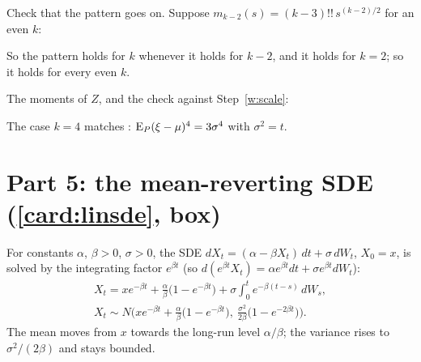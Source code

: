 \begin{steps}[resume]
\item\label{w:dfact} Check that the pattern goes on. Suppose $m_{k-2}(s)=(k-3)!!\,s^{(k-2)/2}$ for an even $k$:
\begin{deriv}
\end{deriv}
So the pattern holds for $k$ whenever it holds for $k-2$, and it holds for $k=2$; so it holds for every even $k$.

\item\label{w:Zk} The moments of $Z$, and the check against Step~\ref{w:scale}:
\begin{deriv}
\end{deriv}
The case $k=4$ matches : $\operatorname{E}_P(\xi-\mu)^4=3\sigma^4$ with $\sigma^2=t$.
\end{steps}


\section*{Part 5: the mean-reverting SDE (\cref{card:linsde}, box)}

\begin{setup}
For constants $\alpha$, $\beta>0$, $\sigma>0$, the SDE $dX_t=(\alpha-\beta X_t)\,dt+\sigma\,dW_t$, $X_0=x$, is solved by the integrating factor $e^{\beta t}$ (so $d(e^{\beta t}X_t)=\alpha e^{\beta t}dt+\sigma e^{\beta t}dW_t$):
\[
  \boxed{\begin{gathered}X_t=xe^{-\beta t}+\frac{\alpha}{\beta}\big(1-e^{-\beta t}\big)+\sigma\int_0^te^{-\beta(t-s)}\,dW_s,\\
  X_t\sim N\Big(xe^{-\beta t}+\frac\alpha\beta\big(1-e^{-\beta t}\big),\ \frac{\sigma^2}{2\beta}\big(1-e^{-2\beta t}\big)\Big).\end{gathered}}
\]
The mean moves from $x$ towards the long-run level $\alpha/\beta$; the variance rises to $\sigma^2/(2\beta)$ and stays bounded.
\end{setup}

